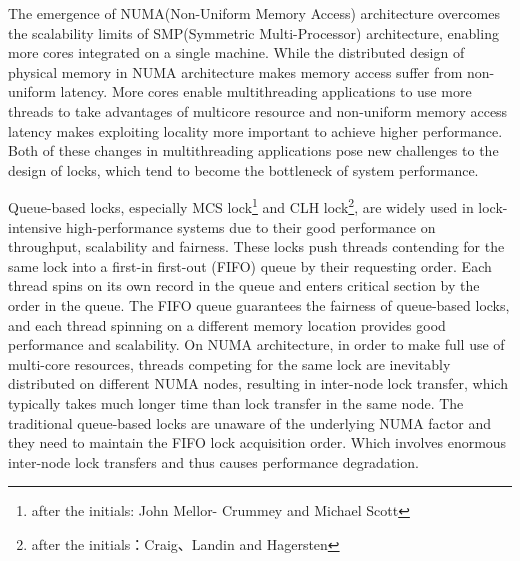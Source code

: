 \begin{englishabstract}
The emergence of NUMA(Non-Uniform Memory Access) architecture overcomes the scalability limits of SMP(Symmetric Multi-Processor) architecture, enabling more cores integrated on a single machine. While the distributed design of physical memory in NUMA architecture makes memory access suffer from non-uniform latency. More cores enable multithreading applications to use more threads to take advantages of multicore resource and non-uniform memory access latency makes exploiting locality more important to achieve higher performance. Both of these changes in multithreading applications pose new challenges to the design of locks, which tend to become the bottleneck of system performance.

Queue-based locks, especially MCS lock\footnote{after the initials: John Mellor-
Crummey and Michael Scott} and CLH lock\footnote{after the initials：Craig、Landin and Hagersten}, are widely used in lock-intensive high-performance systems due to their good performance on throughput, scalability and fairness. These locks push threads contending for the same lock into a first-in first-out (FIFO) queue by their requesting order. Each thread spins on its own record in the queue and enters critical section by the order in the queue. The FIFO queue guarantees the fairness of queue-based locks, and each thread spinning on a different memory location provides good performance and scalability. On NUMA architecture, in order to make full use of multi-core resources, threads competing for the same lock are inevitably distributed on different NUMA nodes, resulting in inter-node lock transfer, which typically takes much longer time than lock transfer in the same node. The traditional queue-based locks are unaware of  the underlying NUMA factor and they need to maintain the FIFO lock acquisition order. Which involves enormous inter-node lock transfers and thus causes performance degradation.



\end{englishabstract}
